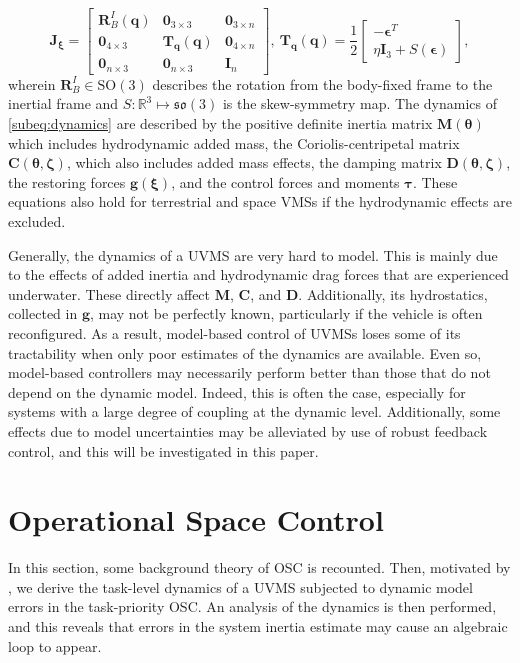 \documentclass[../main.tex]{subfiles}
\begin{document}
\begin{equation}
    \bm{J}_{\bm{\xi}} =
    \begin{bmatrix}
        \bm{R}^I_B(\bm{q}) & \bm{0}_{3\times 3} & \bm{0}_{3\times n} \\
        \bm{0}_{4\times 3} & \bm{T}_{\bm{q}}(\bm{q}) & \bm{0}_{4\times n} \\
        \bm{0}_{n\times 3} & \bm{0}_{n\times 3} & \bm{I}_{n}
    \end{bmatrix}, \
    \bm{T}_{\bm{q}}(\bm{q}) =
    \dfrac{1}{2}
    \begin{bmatrix}
        -\bm{\epsilon}^T \\
        \eta \bm{I}_3 + S(\bm{\epsilon})
    \end{bmatrix},
\end{equation}
wherein $\bm{R}^I_B \in \text{SO}(3)$ describes the rotation from the body-fixed frame to the inertial frame and $S:\mathbb{R}^3 \mapsto \mathfrak{so}(3)$ is the skew-symmetry map. The dynamics of \eqref{subeq:dynamics} are described by the positive definite inertia matrix $\bm{M}(\bm{\theta})$ which includes hydrodynamic added mass, the Coriolis-centripetal matrix $\bm{C}(\bm{\theta},\bm{\zeta})$, which also includes added mass effects, the damping matrix $\bm{D}(\bm{\theta},\bm{\zeta})$, the restoring forces $\bm{g}(\bm{\xi})$, and the control forces and moments $\bm{\tau}$. These equations also hold for terrestrial and space VMSs if the hydrodynamic effects are excluded.%

Generally, the dynamics of a UVMS are very hard to model. This is mainly due to the effects of added inertia and hydrodynamic drag forces that are experienced underwater. These directly affect $\bm{M}$, $\bm{C}$, and $\bm{D}$. Additionally, its hydrostatics, collected in $\bm{g}$, may not be perfectly known, particularly if the vehicle is often reconfigured. As a result, model-based control of UVMSs loses some of its tractability when only poor estimates of the dynamics are available. Even so, model-based controllers may necessarily perform better than those that do not depend on the dynamic model. Indeed, this is often the case, especially for systems with a large degree of coupling at the dynamic level. Additionally, some effects due to model uncertainties may be alleviated by use of robust feedback control, and this will be investigated in this paper.

\section{Operational Space Control}\label{sec:inverse dynamics}
In this section, some background theory of OSC is recounted. Then, motivated by \cite{Dilillo2021}, we derive the task-level dynamics of a UVMS subjected to dynamic model errors in the task-priority OSC. An analysis of the dynamics is then performed, and this reveals that errors in the system inertia estimate may cause an algebraic loop to appear.
\end{document}
